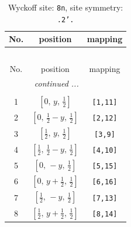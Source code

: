 \documentclass[fleqn,8pt]{jsarticle}
\begin{document}
\begin{longtable}{ccc}
\caption{Wyckoff site: {\tt 8n}, site symmetry: {\tt .2'.}}
 \\
 \hline \hline
No. & position & mapping \\ \hline \endfirsthead

\multicolumn{2}{l}{\tablename\ \thetable{}} \\
 \hline \hline
No. & position & mapping \\ \hline \endhead

 \hline \hline
\multicolumn{2}{r}{\footnotesize\it continued ...} \\ \endfoot

 \hline \hline
\multicolumn{2}{r}{} \\ \endlastfoot

1 & $\left[ 0,\, y,\, \frac{1}{2} \right]$ & {\tt [1,11]} \\ \hline
2 & $\left[ 0,\, \frac{1}{2} - y,\, \frac{1}{2} \right]$ & {\tt [2,12]} \\ \hline
3 & $\left[ \frac{1}{2},\, y,\, \frac{1}{2} \right]$ & {\tt [3,9]} \\ \hline
4 & $\left[ \frac{1}{2},\, \frac{1}{2} - y,\, \frac{1}{2} \right]$ & {\tt [4,10]} \\ \hline
5 & $\left[ 0,\, - y,\, \frac{1}{2} \right]$ & {\tt [5,15]} \\ \hline
6 & $\left[ 0,\, y + \frac{1}{2},\, \frac{1}{2} \right]$ & {\tt [6,16]} \\ \hline
7 & $\left[ \frac{1}{2},\, - y,\, \frac{1}{2} \right]$ & {\tt [7,13]} \\ \hline
8 & $\left[ \frac{1}{2},\, y + \frac{1}{2},\, \frac{1}{2} \right]$ & {\tt [8,14]} \\
\end{longtable}
\renewcommand{\arraystretch}{1.2}
\end{document}
